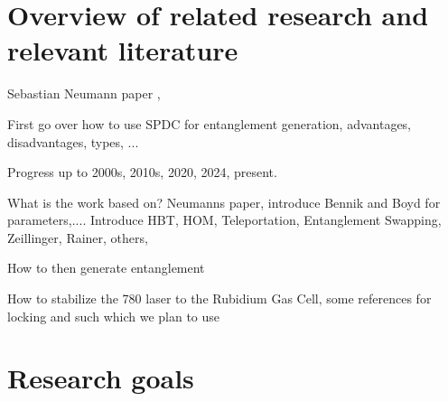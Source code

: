 \documentclass{article}
\theoremstyle{mytheoremstyle}
\theoremstyle{mytheoremstyle}
\theoremstyle{myproblemstyle}
\begin{document}

\section{Overview of related research and relevant literature}

Sebastian Neumann paper \cite{Neumann_Buchner_Bulla_Bohmann_Ursin_2022}, 

First go over how to use SPDC for entanglement generation, advantages, disadvantages, types, ...

Progress up to 2000s, 2010s, 2020, 2024, present.

What is the work based on? Neumanns paper, introduce Bennik and Boyd for parameters,.... Introduce HBT, HOM, Teleportation, Entanglement Swapping, Zeillinger, Rainer, others,

How to then generate entanglement

How to stabilize the 780 laser to the Rubidium Gas Cell, some references for locking and such which we plan to use

\section{Research goals}
\end{document}
